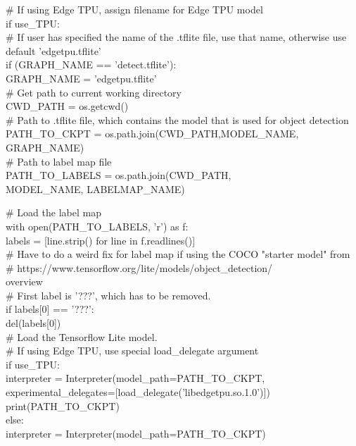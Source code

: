 \# If using Edge TPU, assign filename for Edge TPU model\\
if use\_TPU:\\
    \# If user has specified the name of the .tflite file, use that name, otherwise use default 'edgetpu.tflite'\\
    if (GRAPH\_NAME == 'detect.tflite'):\\
        GRAPH\_NAME = 'edgetpu.tflite'\\       

\# Get path to current working directory\\
CWD\_PATH = os.getcwd()\\

\# Path to .tflite file, which contains the model that is used for object detection\\
PATH\_TO\_CKPT = os.path.join(CWD\_PATH,MODEL\_NAME,\\
GRAPH\_NAME)\\

\# Path to label map file\\
PATH\_TO\_LABELS = os.path.join(CWD\_PATH,\\
MODEL\_NAME, LABELMAP\_NAME)

\# Load the label map\\
with open(PATH\_TO\_LABELS, 'r') as f:\\
    labels = [line.strip() for line in f.readlines()]\\

\# Have to do a weird fix for label map if using the COCO "starter model" from\\
\# https://www.tensorflow.org/lite/models/object\_detection/\\
overview\\
\# First label is '???', which has to be removed.\\
if labels[0] == '???':\\
    del(labels[0])\\

\# Load the Tensorflow Lite model.\\
\# If using Edge TPU, use special load\_delegate argument\\
if use\_TPU:\\
    interpreter = Interpreter(model\_path=PATH\_TO\_CKPT,\\
                              experimental\_delegates=[load\_delegate('libedgetpu.so.1.0')])\\
    print(PATH\_TO\_CKPT)\\
else:\\
    interpreter = Interpreter(model\_path=PATH\_TO\_CKPT)\\

